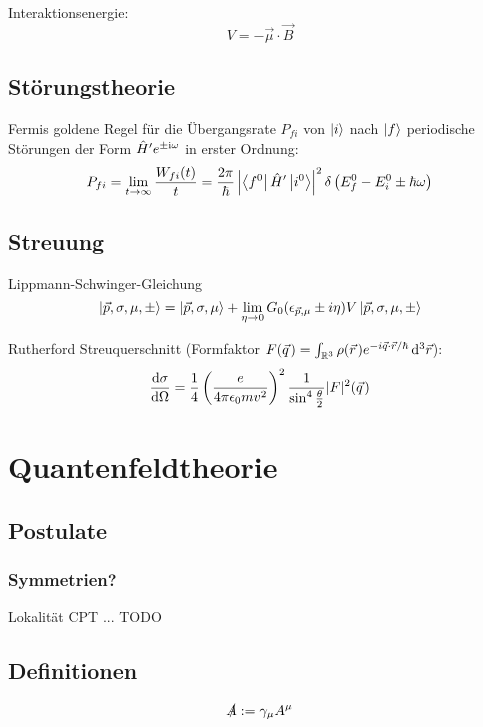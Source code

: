 \documentclass[11pt]{article}
\numberwithin{equation}{section}
\begin{document}
				Interaktionsenergie:
				\begin{equation}
					V = -\vec{\mu} \cdot \vec{B}
				\end{equation}


		\subsection{Störungstheorie}
			\noindent
			Fermis goldene Regel für die Übergangsrate $P_{fi}$ von $\Ket{i}$ nach $\Ket{f}$ periodische Störungen der Form $\hat{H}' e^{\pm\mathrm{i}\omega}$ in erster Ordnung:
			\begin{equation}
				P_{fi} = \lim_{t\rightarrow\infty} \frac{W_{fi}(t)}{t} = \frac{2\pi}{\hbar} \left| \Bra{f^0}\hat{H}'\Ket{i^0} \right|^2 \delta\left( E_f^0 - E_i^0 \pm \hbar\omega \right)
			\end{equation}


		\subsection{Streuung}
			\noindent
			Lippmann-Schwinger-Gleichung
			\begin{equation}
				\Ket{\vec{p},\sigma,\mu,\pm} = \Ket{\vec{p}, \sigma, \mu} + \lim_{\eta\rightarrow 0} G_0(\epsilon_{\vec{p},\mu}\pm i\eta) V \Ket{\vec{p},\sigma,\mu,\pm}
			\end{equation}

			Rutherford Streuquerschnitt (Formfaktor $F(\pvec{q}) = \int_{\mathbb{R}^3} \rho(\pvec{r}) e^{-i \vec{q}\cdot\vec{r}/\hbar}\, \diff^3 \vec{r} $):
			\begin{equation}
				\tder{\sigma}{\Omega} = \frac{1}{4} \Br{\frac{e}{4\pi\epsilon_0 m v^2}}^2
				\frac{1}{\sin^4\frac{\theta}{2}} \vbr{F}^2(\pvec{q})
			\end{equation}


	\newpage
	\section{Quantenfeldtheorie} %
		\subsection{Postulate}
			\subsubsection{Symmetrien?}
				Lokalität
				CPT
				...
				TODO
		\subsection{Definitionen}
			\begin{equation}
				\slashed{A} := \gamma_\mu A^\mu
			\end{equation}
\end{document}
